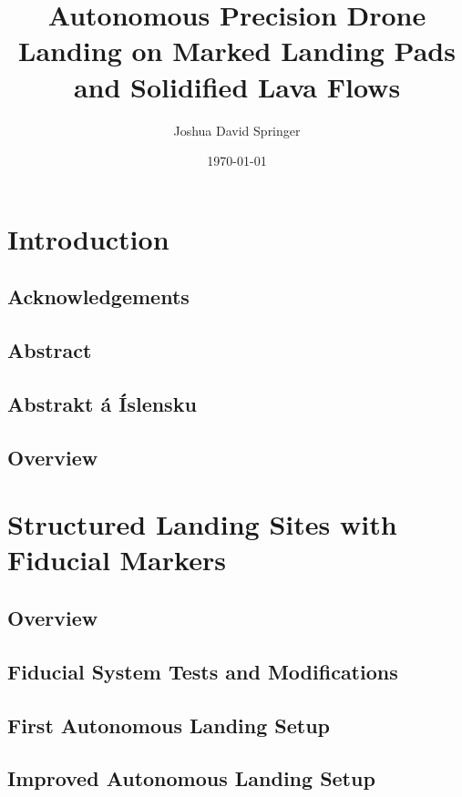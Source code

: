\documentclass[10pt,twoside,b5paper]{book}
\author{Joshua David Springer}
\title{Autonomous Precision Drone Landing on Marked Landing Pads and Solidified Lava Flows}
\date{\specialdate\today}
\begin{document}
	\frontmatter
	
	

	\tableofcontents
	\newpage
	

	\mainmatter
	\chapter{Introduction}
		
		\newpage

		\section{Acknowledgements}
		
		\newpage

		\section{Abstract}
		
		\newpage

		\section{Abstrakt á Íslensku}
		
		\newpage

		\section{Overview}
		
		\newpage

	\chapter{Structured Landing Sites with Fiducial Markers}
		\section{Overview}
		\section{Fiducial System Tests and Modifications}
		\section{First Autonomous Landing Setup}
		\section{Improved Autonomous Landing Setup}
\end{document}
